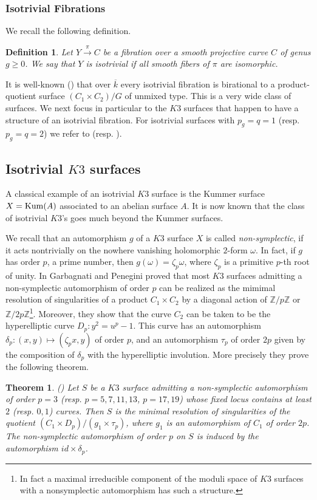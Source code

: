 \documentclass[12pt]{amsart}
\newtheorem{theo}[theo]{Theorem}
\newtheorem{defn}[defn]{Definition}
\theoremstyle{remark}
\newcommand{\Z}{{\mathbb Z}}
\renewcommand{\1}{{\mathbb{S}}}
\newcommand{\<}{\langle}
\renewcommand{\>}{\rangle}
\newcommand{\Kum}{{\rm Kum}}
\begin{document}
\subsubsection{Isotrivial Fibrations}\label{sec:isotrivial}
 We recall the following definition. 
\begin{defn}
    Let $Y\xrightarrow{\pi}C$ be a fibration over a smooth projective curve $C$ of genus $g\geq 0$. We say that $Y$ is isotrivial if all smooth fibers of $\pi$ are isomorphic. 
\end{defn}


 It is well-known (\cite[(1.1)]{Serrano}) that over $\overline{k}$ every isotrivial fibration is birational to a product-quotient surface $(C_1\times C_2)/G$ of unmixed type. This is a very wide class of surfaces. We next focus in particular to the $K3$ surfaces that happen to have a structure of an isotrivial fibration. For isotrivial surfaces with $p_g=q=1$ (resp. $p_g=q=2$) we refer to \cite{P, MP} (resp. \cite{CP}). 
 
\subsection*{Isotrivial $K3$ surfaces} 
A classical example of an isotrivial $K3$ surface is the Kummer surface $X=\Kum(A)$ associated to an abelian surface $A$. It is now known that the class of isotrivial $K3$'s goes much beyond the Kummer surfaces.

We recall that an automorphism $g$ of a $K3$ surface $X$ is called \textit{non-symplectic}, if it acts nontrivially on the nowhere vanishing holomorphic $2$-form $\omega$. In fact, if $g$ has order $p$, a prime number, then $g(\omega)=\zeta_p\omega$, where $\zeta_p$ is a primitive $p$-th root of unity. In \cite{GP} Garbagnati and Penegini proved that most $K3$ surfaces admitting a non-symplectic automorphism of order $p$ can be realized as the mimimal resolution of singularities of a product $C_1\times C_2$ by a diagonal action of $\Z/p\Z$ or $\Z/2p\Z$\footnote{In fact a maximal irreducible component of the moduli space of $K3$ surfaces with a nonsymplectic automorphism has such a structure.}. Moreover, they show that the curve $C_2$ can be taken to be the hyperelliptic curve  $D_p: y^2=u^p-1$. This curve has an automorphism $\delta_p:(x,y)\mapsto(\zeta_p x, y)$  of order $p$, and an automorphism $\tau_p$ of order $2p$ given by the composition of $\delta_p$ with the hyperelliptic involution. More precisely they prove the following theorem. 
\begin{theo} (\cite[Theorem 1.1]{GP})
    Let $S$ be a $K3$ surface admitting a non-symplectic automorphism of order $p=3$ (resp. $p=5, 7, 11, 13$, $p=17, 19$) whose fixed locus contains at least $2$ (resp. $0, 1$) curves. Then $S$ is the minimal resolution of singularities of the quotient $(C_1\times D_p)/(g_1\times \tau_p)$, where $g_1$ is an automorphism of $C_1$ of order $2p$. The non-symplectic automorphism of order $p$ on $S$ is induced by the automorphism $id\times \delta_p$. 
\end{theo}
\end{document}
